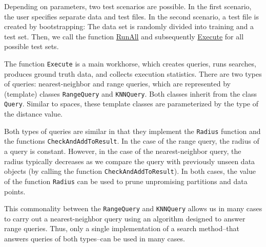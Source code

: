 \documentclass[runningheads,a4paper]{llncs}
\newcommand{\replocfile}{https://github.com/searchivarius/NonMetricSpaceLib/blob/develop/}
\newcommand{\ttt}[1]{\texttt{#1}}
\begin{document}

Depending on parameters, two test scenarios are possible.
In the first scenario, the user specifies separate data and test files.
In the second scenario, a test file is created by bootstrapping:
The data set is randomly divided into training and a test set.
Then,
we call the function \href{\replocfile similarity_search/include/experiments.h#L70}{RunAll} 
and subsequently \href{\replocfile similarity_search/include/experiments.h#L213}{Execute} for all possible test sets.

The function \ttt{Execute} is a main workhorse, which creates queries, runs searches,
produces ground truth data, and collects execution statistics.
There are two types of queries: nearest-neighbor and range queries,
which are represented by (template) classes \ttt{RangeQuery} and \ttt{KNNQuery}.
Both classes inherit from the class \ttt{Query}.
Similar to spaces, these template classes are parameterized by the type of the distance value.

Both types of queries are similar in that they implement the \ttt{Radius} function
and the functions \ttt{CheckAndAddToResult}. 
In the case of the range query, the radius of a query is constant.
However, in the case of the nearest-neighbor query,
the radius typically decreases as we compare the query
with previously unseen data objects (by calling the function \ttt{CheckAndAddToResult}).
In both cases, the value of the function \ttt{Radius} can be used to prune unpromising
partitions and data points.

This commonality between the \ttt{RangeQuery} and \ttt{KNNQuery}
allows us in many cases to carry out a nearest-neighbor query 
using an algorithm designed to answer range queries.
Thus, only a single implementation of a search method--that answers queries of both types--can be used in many cases.
\end{document}
